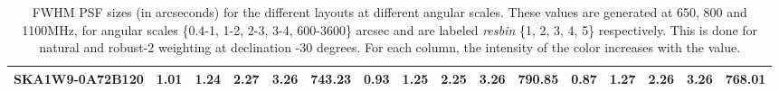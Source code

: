 \begin{table}[!htp]
{{\begin{tabular}{|lccccc||ccccc||ccccc|}
SKA1W9-0A72B120 & 1.01 \cellcolor{blue!28.03} & 1.24 \cellcolor{red!18.00} & 2.27 \cellcolor{green!60.00} & 3.26 \cellcolor{orange!18.00} & 743.23 \cellcolor{purple!58.35} & 0.93 \cellcolor{blue!19.94} & 1.25 \cellcolor{red!18.96} & 2.25 \cellcolor{green!23.38} & 3.26 \cellcolor{orange!60.00} & 790.85 \cellcolor{purple!60.00} & 0.87 \cellcolor{blue!18.00} & 1.27 \cellcolor{red!33.32} & 2.26 \cellcolor{green!55.95} & 3.26 \cellcolor{orange!52.55} & 768.01 \cellcolor{purple!60.00}\\ \hline 
\end{tabular}}
\hspace{1cm} 

\vspace{.0cm}
\caption{FWHM PSF sizes (in arcseconds) for the different layouts at different angular scales. These values are generated at 650, 800 and 1100MHz, for angular scales \{0.4-1, 1-2, 2-3, 3-4, 600-3600\} arcsec and are labeled {\it resbin} \{1, 2, 3, 4, 5\} respectively. This is done for natural and robust-2 weighting at declination -30 degrees. For each column, the intensity of the color increases with the value.}\label{tab:psf_mean}}
 \end{table}
